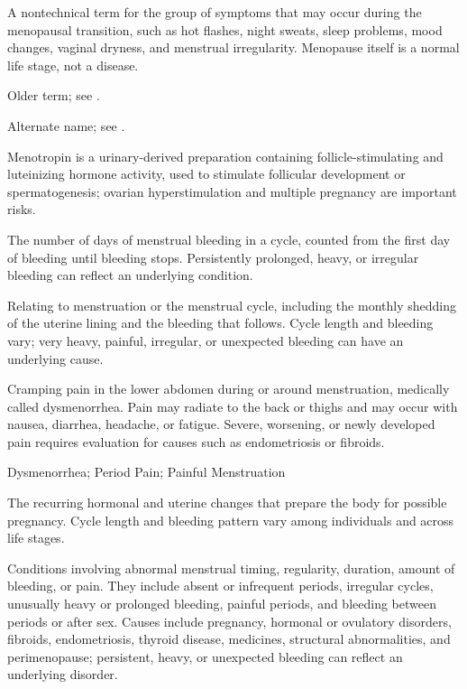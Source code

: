  A nontechnical term for the group of symptoms that may occur during the menopausal transition, such as hot flashes, night sweats, sleep problems, mood changes, vaginal dryness, and menstrual irregularity. Menopause itself is a normal life stage, not a disease.

 Older term; see .

 Alternate name; see .

 Menotropin is a urinary-derived preparation containing follicle-stimulating and luteinizing hormone activity, used to stimulate follicular development or spermatogenesis; ovarian hyperstimulation and multiple pregnancy are important risks.

 The number of days of menstrual bleeding in a cycle, counted from the first day of bleeding until bleeding stops. Persistently prolonged, heavy, or irregular bleeding can reflect an underlying condition.

 Relating to menstruation or the menstrual cycle, including the monthly shedding of the uterine lining and the bleeding that follows. Cycle length and bleeding vary; very heavy, painful, irregular, or unexpected bleeding can have an underlying cause.

 Cramping pain in the lower abdomen during or around menstruation, medically called dysmenorrhea. Pain may radiate to
the back or thighs and may occur with nausea, diarrhea, headache, or fatigue. Severe, worsening, or newly
developed pain requires evaluation for causes such as endometriosis or fibroids.

\synonyms
Dysmenorrhea; Period Pain; Painful Menstruation

 The recurring hormonal and uterine changes that prepare the body for possible pregnancy. Cycle length and
bleeding pattern vary among individuals and across life stages.

 Conditions involving abnormal menstrual timing, regularity, duration, amount of bleeding, or pain. They include absent or infrequent periods, irregular cycles, unusually heavy or prolonged bleeding, painful periods, and bleeding between periods or after sex. Causes include pregnancy, hormonal or ovulatory disorders, fibroids, endometriosis, thyroid disease, medicines, structural abnormalities, and perimenopause; persistent, heavy, or unexpected bleeding can reflect an underlying disorder.


